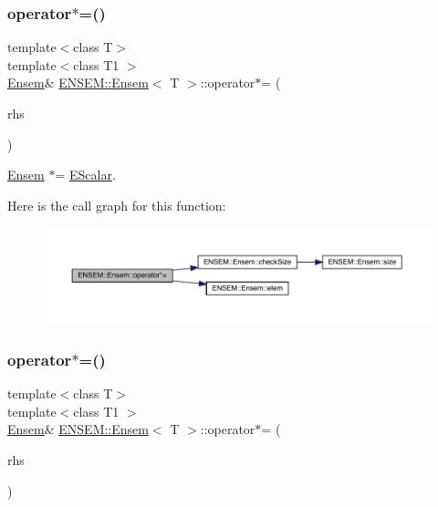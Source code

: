 \subsubsection{\texorpdfstring{operator$\ast$=()}{operator*=()}\hspace{0.1cm}{\footnotesize\ttfamily [2/6]}}
{\footnotesize\ttfamily template$<$class T$>$ \\
template$<$class T1 $>$ \\
\mbox{\hyperlink{classENSEM_1_1Ensem}{Ensem}}\& \mbox{\hyperlink{classENSEM_1_1Ensem}{E\+N\+S\+E\+M\+::\+Ensem}}$<$ T $>$\+::operator$\ast$= (\begin{DoxyParamCaption}\item[{const \mbox{\hyperlink{classENSEM_1_1EScalar}{E\+Scalar}}$<$ T1 $>$ \&}]{rhs }\end{DoxyParamCaption})\hspace{0.3cm}{\ttfamily [inline]}}



\mbox{\hyperlink{classENSEM_1_1Ensem}{Ensem}} $\ast$= \mbox{\hyperlink{classENSEM_1_1EScalar}{E\+Scalar}}. 

Here is the call graph for this function\+:
\nopagebreak
\begin{figure}[H]
\begin{center}
\leavevmode
\includegraphics[width=350pt]{d7/d3e/classENSEM_1_1Ensem_abacb93dfca393ddb29f317d35e2fff7f_cgraph}
\end{center}
\end{figure}
\mbox{\label{classENSEM_1_1Ensem_abacb93dfca393ddb29f317d35e2fff7f}} 
\subsubsection{\texorpdfstring{operator$\ast$=()}{operator*=()}\hspace{0.1cm}{\footnotesize\ttfamily [3/6]}}
{\footnotesize\ttfamily template$<$class T$>$ \\
template$<$class T1 $>$ \\
\mbox{\hyperlink{classENSEM_1_1Ensem}{Ensem}}\& \mbox{\hyperlink{classENSEM_1_1Ensem}{E\+N\+S\+E\+M\+::\+Ensem}}$<$ T $>$\+::operator$\ast$= (\begin{DoxyParamCaption}\item[{const \mbox{\hyperlink{classENSEM_1_1EScalar}{E\+Scalar}}$<$ T1 $>$ \&}]{rhs }\end{DoxyParamCaption})\hspace{0.3cm}{\ttfamily [inline]}}



